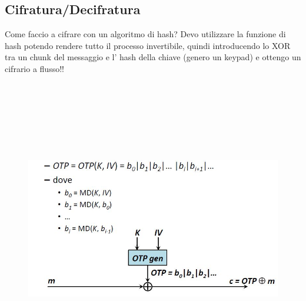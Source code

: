 \subsection{Cifratura/Decifratura} 
Come faccio a cifrare con un algoritmo di hash? Devo utilizzare la funzione di hash potendo rendere tutto il processo invertibile, quindi introducendo lo XOR tra un chunk del messaggio e l' hash della chiave (genero un keypad) e ottengo un cifrario a flusso!!
\begin{figure}
	\begin{center}
	{\includegraphics[height=13cm, width=13cm, keepaspectratio]{Immagini/Capitolo4/schema_cifratura_flusso.JPG}}
	\end{center}
\end{figure}


